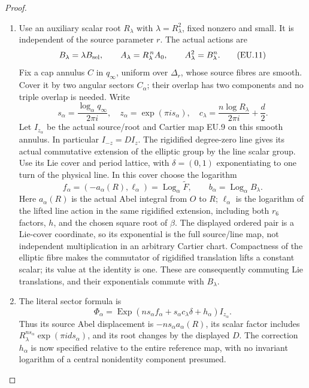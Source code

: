 \begin{proof}
\begin{enumerate}[label=\arabic*.]
\par

\medskip\noindent\textbf{EU.4. The complete annular reference, scalar and closing}

\par\nobreak

\item Use an auxiliary scalar root \(R_\lambda\) with
\(\lambda=R_\lambda^2\), fixed nonzero and small. It is independent
of the source parameter \(r\). The actual actions are
\[
 B_\lambda=\lambda B_{\rm sel},\qquad
 A_{\lambda}=R_\lambda^{\,n}A_0,\qquad
 A_\lambda^2=B_\lambda^n.
 \tag{EU.11}
\]
Fix a cap annulus \(C\) in \(q_\infty\), uniform over
\(\Delta_r\), whose source fibres are smooth. Cover it by two angular
sectors \(C_\alpha\); their overlap has two components and no triple
overlap is needed. Write
\[
 s_\alpha=\frac{\log_\alpha q_\infty}{2\pi i},\quad
 z_\alpha=\exp(\pi i s_\alpha),\quad
 c_\lambda=\frac{n\log R_\lambda}{2\pi i}+\frac d2.
 \tag{EU.11a}
\]
Let \(I_{z_\alpha}\) be the actual source/root and Cartier map
EU.9 on this smooth annulus. In particular
\(I_{-z}=D I_z\). The rigidified degree-zero line gives its actual
commutative extension of the elliptic group by the line scalar group.
Use its Lie cover and period lattice, with
\(\delta=(0,1)\) exponentiating to one turn of the physical line.
In this cover choose the logarithm
\[
 f_\alpha=(-a_\alpha(R),\ell_\alpha)
       =\operatorname{Log}_\alpha\widetilde F,
 \qquad b_\alpha=\operatorname{Log}_\alpha B_\lambda.
 \tag{EU.11b}
\]
Here \(a_\alpha(R)\) is the actual Abel integral from \(O\) to
\(R\); \(\ell_\alpha\) is the logarithm of the lifted line action
in the same rigidified extension, including both \(r_6\) factors,
\(h\), and the chosen square root of \(\beta\). The displayed
ordered pair is a Lie-cover coordinate, so its exponential is the
full source/line map, not independent multiplication in an arbitrary
Cartier chart. Compactness of the elliptic fibre makes the commutator
of rigidified translation lifts a constant scalar; its value at the
identity is one. These are consequently commuting Lie translations,
and their exponentials commute with \(B_\lambda\).

\item The literal sector formula is
\[
 \Phi_\alpha
   =\operatorname{Exp}\!\left(
       n s_\alpha f_\alpha+s_\alpha c_\lambda\delta
                         +h_\alpha\right)I_{z_\alpha}.
 \tag{EU.11c}
\]
Thus its source Abel displacement is
\(-n s_\alpha a_\alpha(R)\), its scalar factor includes
\(R_\lambda^{n s_\alpha}\exp(\pi i d s_\alpha)\), and its
root changes by the displayed \(D\). The correction \(h_\alpha\)
is now specified relative to the entire reference map, with no
invariant logarithm of a central nonidentity component presumed.


\end{enumerate}
\end{proof}

